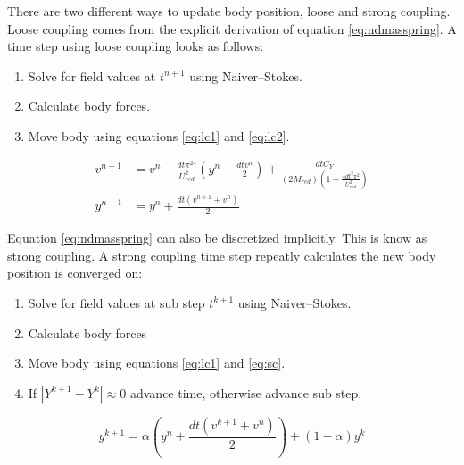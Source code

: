 \documentclass[onehalf,11pt]{beavtex}
\begin{document}
There are two different ways to update body position, loose and strong coupling.
Loose coupling comes from the explicit derivation of equation \eqref{eq:ndmasspring}.
A time step using loose coupling looks as follows:
\begin{enumerate}
	\item Solve for field values at $t^{n+1}$ using Naiver--Stokes.
	\item Calculate body forces.
	\item Move body using equations \eqref{eq:lc1} and \eqref{eq:lc2}.
\end{enumerate}
\begin{align}
v^{n+1} &= v^n-\frac{dt\pi^24}{U_{red}^2}\left(y^n+\frac{dtv^n}{2}\right) + \frac{dtC_Y}{\left(2M_{red}\right)\left(1+\frac{4dt^2\pi^2}{U_{red}^2}\right)} \label{eq:lc1} \\
y^{n+1} &= y^n +\frac{dt\left(v^{n+1}+v^n\right)}{2}\; \label{eq:lc2}
\end{align}

Equation \eqref{eq:ndmasspring} can also be discretized implicitly.
This is know as strong coupling.
A strong coupling time step repeatly calculates the new body position is converged on:
\begin{enumerate}
	\item Solve for field values at sub step $t^{k+1}$ using Naiver--Stokes.
	\item Calculate body forces
	\item Move body using equations \eqref{eq:lc1} and \eqref{eq:sc}.
	\item If $|Y^{k+1}-Y^k| \approx 0$ advance time, otherwise advance sub step.
\end{enumerate}
\begin{equation}
y^{k+1} = \alpha \left(y^n+\frac{dt\left(v^{k+1}+v^n\right)}{2}\right) +\left(1-\alpha\right)y^k\label{eq:sc}
\end{equation}
\end{document}
